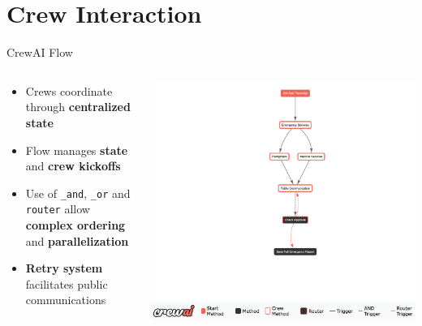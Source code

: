 \section{Crew Interaction}
\begin{frame}{CrewAI Flow}
    \begin{columns}
        \begin{column}{0.45\textwidth}
            \begin{itemize}
                \item Crews coordinate through \textbf{centralized state}
                \item Flow manages \textbf{state} and \textbf{crew kickoffs}
                \item Use of \texttt{\_and}, \texttt{\_or} and \texttt{router} allow \textbf{complex ordering} and \textbf{parallelization}
                \item \textbf{Retry system} facilitates public communications
            \end{itemize}
        \end{column}
        \begin{column}{0.55\textwidth}
            \includegraphics[width=\textwidth]{../figures/coordination_flow.png}
        \end{column}
    \end{columns}
\end{frame}

